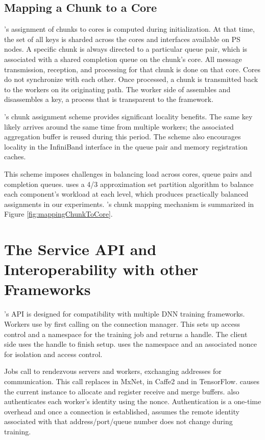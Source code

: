 \subsection{Mapping a Chunk to a Core}
\label{sec:chunk2core}
\phub's assignment of chunks to cores is computed during initialization. At that time, the set of all keys is sharded across the cores and interfaces available on PS nodes.
A specific chunk is always directed to a particular queue pair,
which is associated with a shared completion queue on the chunk's core.
All message transmission, reception, and processing for that chunk is done on that core. Cores do not synchronize with each other. Once processed, a chunk is transmitted back to the workers on its originating path. The worker side of \phub assembles and disassembles a key, a process that is transparent to the framework.

\phub{}'s chunk assignment scheme provides significant locality benefits. The same key likely arrives around the same time from multiple workers; the associated aggregation buffer is reused during this period. The scheme also encourages locality in the InfiniBand interface in the queue pair and memory registration caches. %

This scheme imposes challenges in balancing load across cores, queue pairs and completion queues. \phub uses a 4/3 approximation set partition algorithm to balance each component's workload at each level, which produces practically balanced assignments in our experiments. \phub{}'s chunk mapping mechanism is summarized in Figure \ref{fig:mappingChunkToCore}.

\section{The \phub Service API and Interoperability with other Frameworks}
\phub{}'s API is designed for compatibility with multiple DNN training frameworks. Workers use \phub by first calling  on the connection manager. This sets up access control and a namespace for the training job and returns a handle. The client side uses the handle to finish setup. \phub uses the namespace and an associated nonce for isolation and access control. 

Jobs call  to rendezvous servers and workers, exchanging addresses for communication. This call replaces  in MxNet,  in Caffe2 and  in TensorFlow.  causes the current \phub instance to allocate and register receive and merge buffers. \phub also authenticates each worker's identity using the nonce. Authentication is a one-time overhead and once a connection is established, \phub assumes the remote identity associated with that address/port/queue number does not change during training.


